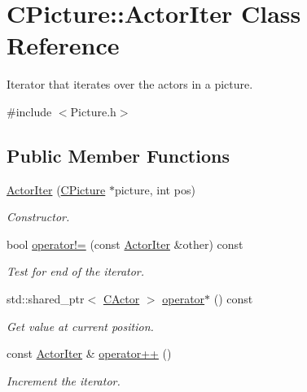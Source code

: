 \hypertarget{class_c_picture_1_1_actor_iter}{\section{C\+Picture\+:\+:Actor\+Iter Class Reference}
\label{class_c_picture_1_1_actor_iter}
}


Iterator that iterates over the actors in a picture.  




{\ttfamily \#include $<$Picture.\+h$>$}

\subsection*{Public Member Functions}
\begin{DoxyCompactItemize}
\item 
\hyperlink{class_c_picture_1_1_actor_iter_a2f2f57be59c8599af1e2c304272d2deb}{Actor\+Iter} (\hyperlink{class_c_picture}{C\+Picture} $\ast$picture, int pos)
\begin{DoxyCompactList}\small\item\em Constructor. \end{DoxyCompactList}\item 
bool \hyperlink{class_c_picture_1_1_actor_iter_a68cc04a07bd5766b1d7b0ca0c0bcb856}{operator!=} (const \hyperlink{class_c_picture_1_1_actor_iter}{Actor\+Iter} \&other) const 
\begin{DoxyCompactList}\small\item\em Test for end of the iterator. \end{DoxyCompactList}\item 
std\+::shared\+\_\+ptr$<$ \hyperlink{class_c_actor}{C\+Actor} $>$ \hyperlink{class_c_picture_1_1_actor_iter_a7401edfaeb0f0fb2ff54df57d84a3777}{operator$\ast$} () const 
\begin{DoxyCompactList}\small\item\em Get value at current position. \end{DoxyCompactList}\item 
const \hyperlink{class_c_picture_1_1_actor_iter}{Actor\+Iter} \& \hyperlink{class_c_picture_1_1_actor_iter_a8e52080b2ce8a1f12e2dfcef310b2164}{operator++} ()
\begin{DoxyCompactList}\small\item\em Increment the iterator. \end{DoxyCompactList}\end{DoxyCompactItemize}


